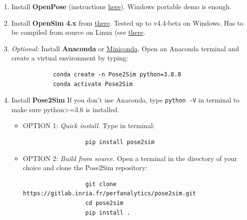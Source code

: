 \begin{enumerate}[itemsep=0em, topsep=0em, leftmargin=*]
      \item Install \textbf{OpenPose} (instructions \href{https://github.com/CMU-Perceptual-Computing-Lab/openpose/blob/master/doc/installation/0_index.md}{here}).\newline
      Windows portable demo is enough.
      \item Install \textbf{OpenSim 4.x} from \href{https://simtk.org/frs/index.php?group_id=91}{there}.\newline
      Tested up to v4.4-beta on Windows. Has to be compiled from source on Linux (see \href{https://simtk-confluence.stanford.edu:8443/display/OpenSim/Linux+Support}{there}.
      \item \textit{Optional:} Install \textbf{Anaconda} or \href{https://docs.conda.io/en/latest/miniconda.html}{Miniconda}.\newline
      Open an Anaconda terminal and create a virtual environment by typing:
      \begin{verbatim}
            conda create -n Pose2Sim python=3.8.8
            conda activate Pose2Sim
      \end{verbatim}
      \item Install \textbf{Pose2Sim}\newline
      If you don't use Anaconda, type \texttt{python -V} in terminal to make sure python>=3.6 is installed.
      \begin{itemize}
            \item OPTION 1: \textit{Quick install.} Type in terminal:
            \begin{verbatim}
                  pip install pose2sim
            \end{verbatim}
            \item OPTION 2: \textit{Build from source.} Open a terminal in the directory of your choice and clone the Pose2Sim repository:
            \begin{verbatim}
                  git clone https://gitlab.inria.fr/perfanalytics/pose2sim.git
                  cd pose2sim
                  pip install .
            \end{verbatim}
      \end{itemize}
\end{enumerate}


